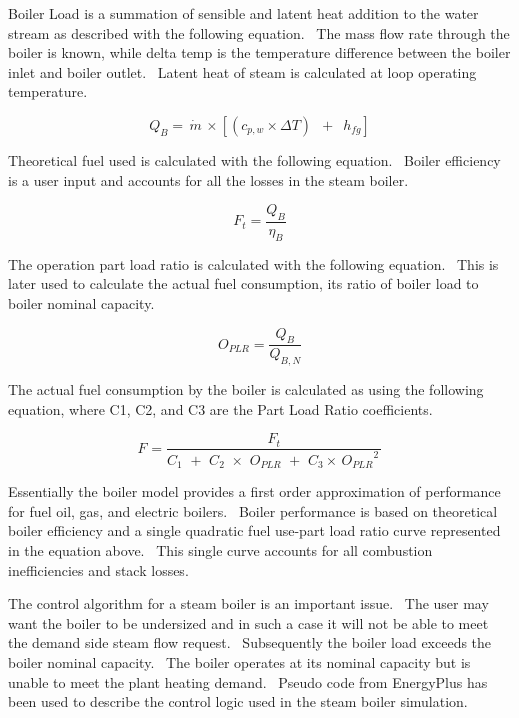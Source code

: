Boiler Load is a summation of sensible and latent heat addition to the water stream as described with the following equation.~ The mass flow rate through the boiler is known, while delta temp is the temperature difference between the boiler inlet and boiler outlet.~ Latent heat of steam is calculated at loop operating temperature.

\begin{equation}
{Q_B} = \,\dot m\, \times \left[ {({c_{p,w}} \times \Delta T)\,\,\, + \,\,\,{h_{fg}}} \right]
\end{equation}

Theoretical fuel used is calculated with the following equation.~ Boiler efficiency is a user input and accounts for all the losses in the steam boiler.

\begin{equation}
{F_t} = \frac{{{Q_B}}}{{{\eta_B}}}
\end{equation}

The operation part load ratio is calculated with the following equation.~ This is later used to calculate the actual fuel consumption, its ratio of boiler load to boiler nominal capacity.

\begin{equation}
{O_{PLR}} = \frac{{{Q_B}}}{{{Q_{B,N}}}}
\end{equation}

The actual fuel consumption by the boiler is calculated as using the following equation, where C1, C2, and C3 are the Part Load Ratio coefficients.

\begin{equation}
{F_{}} = \frac{{{F_t}}}{{{C_1}\,\, + \,\,{C_2}\,\, \times \,\,{O_{PLR}}\,\, + \,\,{C_3} \times \,{O_{PLR}}^2\,}}
\end{equation}

Essentially the boiler model provides a first order approximation of performance for fuel oil, gas, and electric boilers.~ Boiler performance is based on theoretical boiler efficiency and a single quadratic fuel use-part load ratio curve represented in the equation above.~ This single curve accounts for all combustion inefficiencies and stack losses.

The control algorithm for a steam boiler is an important issue.~ The user may want the boiler to be undersized and in such a case it will not be able to meet the demand side steam flow request.~ Subsequently the boiler load exceeds the boiler nominal capacity.~ The boiler operates at its nominal capacity but is unable to meet the plant heating demand.~ Pseudo code from EnergyPlus has been used to describe the control logic used in the steam boiler simulation.

